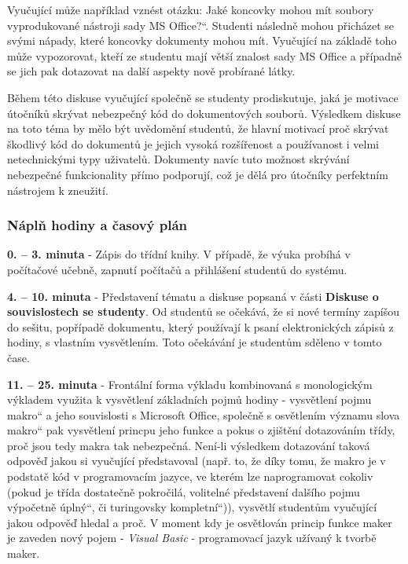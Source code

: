 \documentclass[a4paper, 12pt]{article}
\providecommand{\uv}[1]{\quotedblbase #1\textquotedblleft}
\begin{document}
Vyučující může například vznést otázku: \uv{Jaké koncovky mohou mít soubory vyprodukované nástroji sady MS Office?}. Studenti následně mohou přicházet se svými nápady, které koncovky dokumenty mohou mít. Vyučující na základě toho může vypozorovat, kteří ze studentu mají větší znalost sady MS Office a případně se jich pak dotazovat na další aspekty nově probírané látky. 

Během této diskuse vyučující společně se studenty prodiskutuje, jaká je motivace útočníků skrývat nebezpečný kód do dokumentových souborů. Výsledkem diskuse na toto téma by mělo být uvědomění studentů, že hlavní motivací proč skrývat škodlivý kód do dokumentů je jejich vysoká rozšířenost a používanost i velmi netechnickými typy uživatelů. Dokumenty navíc tuto možnost skrývání nebezpečné funkcionality přímo podporují, což je dělá pro útočníky perfektním nástrojem k zneužití.

\subsubsection{Náplň hodiny a časový plán}
\indent\textbf{0. -- 3. minuta} - Zápis do třídní knihy. V případě, že výuka probíhá v počítačové učebně, zapnutí počítačů a přihlášení studentů do systému.

\textbf{4. -- 10. minuta} - Představení tématu a diskuse popsaná v části \textbf{Diskuse o souvislostech se studenty}. Od studentů se očekává, že si nové termíny zapíšou do sešitu, popřípadě dokumentu, který používají k psaní elektronických zápisů z hodiny, s vlastním vysvětlením. Toto očekávání je studentům sděleno v tomto čase.

\textbf{11. -- 25. minuta} - Frontální forma výkladu kombinovaná s monologickým výkladem využita k vysvětlení základních pojmů hodiny - vysvětlení pojmu \uv{makro} a jeho souvislosti s Microsoft Office, společně s osvětlením významu slova \uv{makro} pak vysvětlení princpu jeho funkce a pokus o zjištění dotazováním třídy, proč jsou tedy makra tak nebezpečná. Není-li výsledkem dotazování taková odpověď jakou si vyučující představoval (např. to, že díky tomu, že makro je v podstatě kód v programovacím jazyce, ve kterém lze naprogramovat cokoliv (pokud je třída dostatečně pokročilá, volitelné představení dalšího pojmu \uv{výpočetně úplný}, či \uv{turingovsky kompletní})), vysvětlí studentům vyučující jakou odpověď hledal a proč. V moment kdy je osvětlován princip funkce maker je zaveden nový pojem - \textit{Visual Basic} - programovací jazyk užívaný k tvorbě maker.
\end{document}
